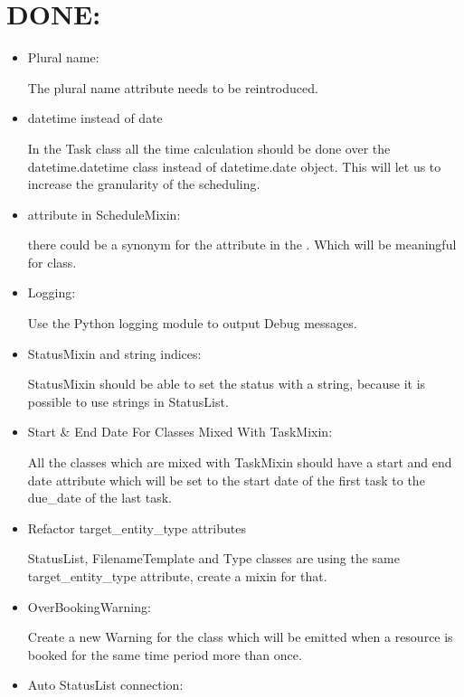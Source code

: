 \documentclass[a4paper,10pt,english]{sphinxmanual}
\begin{document}
\chapter{DONE:}
\label{todo:done}\begin{itemize}
\item {} 
Plural name:

The plural name attribute needs to be reintroduced.

\item {} 
datetime instead of date

In the Task class all the time calculation should be done over the
datetime.datetime class instead of datetime.date object. This will let us
to increase the granularity of the scheduling.

\item {} 
 attribute in ScheduleMixin:

there could be a synonym for the  attribute in the
. Which will be meaningful for
 class.

\item {} 
Logging:

Use the Python logging module to output Debug messages.

\item {} 
StatusMixin and string indices:

StatusMixin should be able to set the status with a string, because it is
possible to use strings in StatusList.

\item {} 
Start \& End Date For Classes Mixed With TaskMixin:

All the classes which are mixed with TaskMixin should have a start and end
date attribute which will be set to the start date of the first task to the
due\_date of the last task.

\item {} 
Refactor target\_entity\_type attributes

StatusList, FilenameTemplate and Type classes are using the same
target\_entity\_type attribute, create a mixin for that.

\item {} 
OverBookingWarning:

Create a new Warning for the  class
which will be emitted when a resource is booked for the same time period
more than once.

\item {} 
Auto StatusList connection:


\end{itemize}
\end{document}
